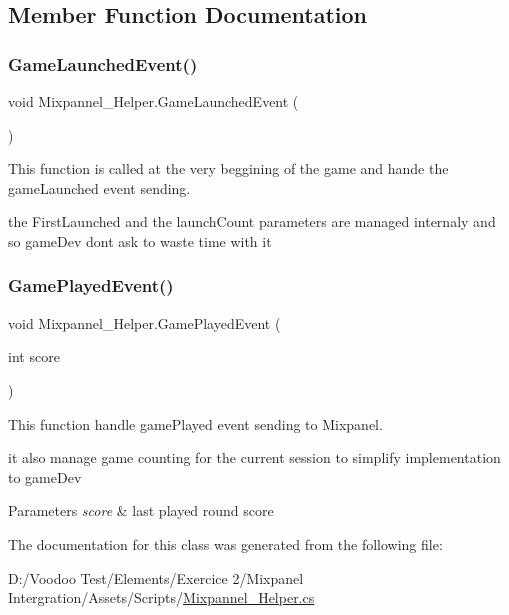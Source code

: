 \subsection{Member Function Documentation}
\mbox{\label{class_mixpannel___helper_a6deb2506716775a1828fd4cff1ffa6b7}} 
\subsubsection{\texorpdfstring{Game\+Launched\+Event()}{GameLaunchedEvent()}}
{\footnotesize\ttfamily void Mixpannel\+\_\+\+Helper.\+Game\+Launched\+Event (\begin{DoxyParamCaption}{ }\end{DoxyParamCaption})}



This function is called at the very beggining of the game and hande the game\+Launched event sending. 

the First\+Launched and the launch\+Count parameters are managed internaly and so game\+Dev don\textquotesingle{}t ask to waste time with it \mbox{\label{class_mixpannel___helper_a0d516d08396ffd740dd7805e1644c458}} 
\subsubsection{\texorpdfstring{Game\+Played\+Event()}{GamePlayedEvent()}}
{\footnotesize\ttfamily void Mixpannel\+\_\+\+Helper.\+Game\+Played\+Event (\begin{DoxyParamCaption}\item[{int}]{score }\end{DoxyParamCaption})}



This function handle game\+Played event sending to Mixpanel. 

it also manage game counting for the current session to simplify implementation to game\+Dev 
\begin{DoxyParams}{Parameters}
{\em score} & last played round score \\
\hline
\end{DoxyParams}


The documentation for this class was generated from the following file\+:\begin{DoxyCompactItemize}
\item 
D\+:/\+Voodoo Test/\+Elements/\+Exercice 2/\+Mixpanel Intergration/\+Assets/\+Scripts/\mbox{\hyperlink{_mixpannel___helper_8cs}{Mixpannel\+\_\+\+Helper.\+cs}}\end{DoxyCompactItemize}
